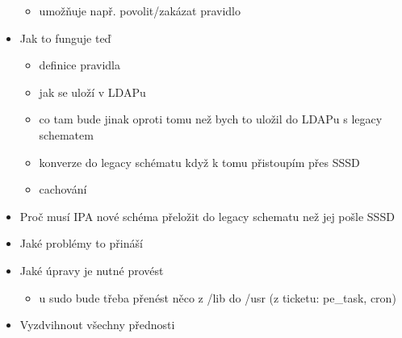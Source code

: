 \documentclass[12pt,a4paper,titlepage,final]{article}
\begin{document}
\begin{itemize}
        \begin{itemize}
                \item umožňuje např. povolit/zakázat pravidlo
        \end{itemize}
                
        \item Jak to funguje teď

        \begin{itemize}
                \item definice pravidla
                \item jak se uloží v LDAPu
                \item co tam bude jinak oproti tomu než bych to uložil do LDAPu s legacy
                        schematem
                \item konverze do legacy schématu když k tomu přistoupím přes SSSD
                \item cachování
        \end{itemize}
        \item Proč musí IPA nové schéma přeložit do legacy schematu než jej pošle
                SSSD
        \item Jaké problémy to přináší
        \item Jaké úpravy je nutné provést
        \begin{itemize}
                \item u sudo bude třeba přenést něco z /lib do /usr (z ticketu: pe\_task,
                        cron)
        \end{itemize}
        \item Vyzdvihnout všechny přednosti
\end{itemize} 
\end{document}
